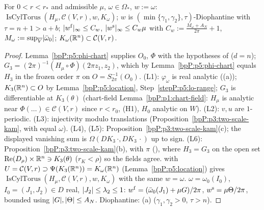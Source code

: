 \begin{proposition}\label{bpP:p5:torus-conv}
For $0<r<r_*$ and admissible $\mu$, $\omega\in\Omega_*$, $w:=\omega$: $\operatorname{IsCylTorus}(H_\mu,\mathcal C(V,r),w,K_\omega)$; $w$ is $(\min\{\gamma_1,\gamma_2\},\tau)$-Diophantine with $\tau=n+1>a+b$; $\lvert w^{\rm f}\rvert_\infty\le C_w$, $\lvert w^{\rm s}\rvert_\infty\le C_w\mu$ with $C_w:=\frac{M_\omega+A_N}{2\pi}+1$, $M_\omega:=\sup_{\overline V}\lvert \bar\omega_0\rvert$; $K_\omega(\mathbb{R}^n)\subset\mathcal C(V,r)$.
\end{proposition}
\begin{proof}
\label{stepP:p5:tc-chart} Lemma~\ref{bpP:p5:phi-chart} supplies $O_0$, $\Phi$ with the hypotheses of  ($d=n$); $G_3=(2\pi)^{-1}(H_\mu\circ\Phi)(2\pi z_1,z_2)$, which by Lemma~\ref{bpP:p5:phi-chart} equals $H_3$ in the frozen order $\pi$ on $O=S_{2\pi}^{-1}(O_0)$.
\label{stepP:p5:tc-LT} (L1): $\varphi_\omega$ is real analytic ((a)); $K_3(\mathbb{R}^n)\subset O$ by Lemma~\ref{bpP:p5:location}, Step~\ref{stepP:p5:lo-range}; $G_3$ is differentiable at $K_3(\theta)$ (chart-field Lemma~\ref{bpP:p1:chart-field}: $H_\mu$ is analytic near $\Phi(\ldots)\in\mathcal C(V,r)$ since $r<r_0$, (H1), $H_0$ analytic on $W$). (L2): $v,u$ are $1$-periodic. (L3): injectivity modulo translations (Proposition~\ref{bpP:p3:two-scale-kam}, with equal $\omega$). (L4), (L5): Proposition~\ref{bpP:p3:two-scale-kam}(c); the displayed vanishing sum is $\Omega(DK_3\,\cdot,DK_3\,\cdot)$ up to sign. (L6): Proposition~\ref{bpP:p3:two-scale-kam}(b), with $\pi$ (), where $H_3=G_3$ on the open set $\operatorname{Re}(D_\rho)\times\mathbb{R}^n\ni K_3(\theta)$ ($r_K<\rho$) so the fields agree.
\label{stepP:p5:tc-pipe}  with $U=\mathcal C(V,r)\supset\Psi(K_3(\mathbb{R}^n))=K_\omega(\mathbb{R}^n)$ (Lemma~\ref{bpP:p5:location}) gives $\operatorname{IsCylTorus}(H_\mu,\mathcal C(V,r),w,K_\omega)$ with the same $w=\omega$.
\label{stepP:p5:tc-freq} $\omega=\omega_0(I_0)$, $I_0=(J_1,J_2)\in D$ real, $\lvert J_2\rvert\le\lambda_2\le1$: $w^{\rm f}=(\bar\omega_0(J_1)+\mu G)/2\pi$, $w^{\rm s}=\mu\Theta/2\pi$, bounded using $\lvert G\rvert,\lvert \Theta\rvert\le A_N$. Diophantine: (a) ($\gamma_1,\gamma_2>0$, $\tau>n$).
\end{proof}


